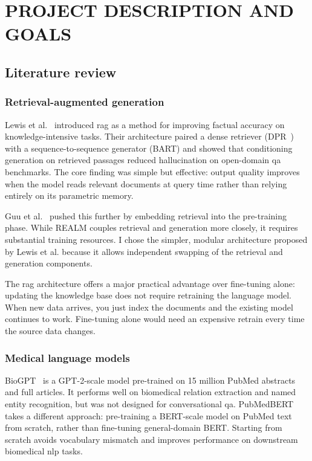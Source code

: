 \chapter{\MakeUppercase{Project Description and Goals}}

\section{Literature review}

\subsection{Retrieval-augmented generation}

Lewis et al.~\cite{lewis2020rag} introduced \ac{rag} as a method for improving factual accuracy on knowledge-intensive tasks. Their architecture paired a dense retriever (DPR~\cite{karpukhin2020dpr}) with a sequence-to-sequence generator (BART) and showed that conditioning generation on retrieved passages reduced hallucination on open-domain \ac{qa} benchmarks. The core finding was simple but effective: output quality improves when the model reads relevant documents at query time rather than relying entirely on its parametric memory.

Guu et al.~\cite{guu2020realm} pushed this further by embedding retrieval into the pre-training phase. While REALM couples retrieval and generation more closely, it requires substantial training resources. I chose the simpler, modular architecture proposed by Lewis et al. because it allows independent swapping of the retrieval and generation components.

The \ac{rag} architecture offers a major practical advantage over fine-tuning alone: updating the knowledge base does not require retraining the language model. When new data arrives, you just index the documents and the existing model continues to work. Fine-tuning alone would need an expensive retrain every time the source data changes.

\subsection{Medical language models}

BioGPT~\cite{luo2022biogpt} is a GPT-2-scale model pre-trained on 15 million PubMed abstracts and full articles. It performs well on biomedical relation extraction and named entity recognition, but was not designed for conversational \ac{qa}. PubMedBERT~\cite{gu2021pubmedbert} takes a different approach: pre-training a BERT-scale model on PubMed text from scratch, rather than fine-tuning general-domain BERT. Starting from scratch avoids vocabulary mismatch and improves performance on downstream biomedical \ac{nlp} tasks.

